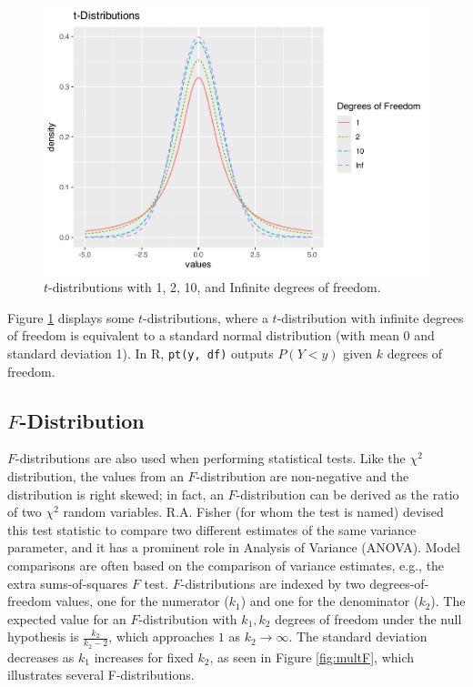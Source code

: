 \documentclass[
]{krantz}
\begin{document}
\begin{figure}

{\centering \includegraphics[width=0.6\linewidth]{bookdown-BeyondMLR_files/figure-latex/multT-1} 

}

\caption{\(t\)-distributions with 1, 2, 10, and Infinite degrees of freedom.}\label{fig:multT}
\end{figure}

Figure \ref{fig:multT} displays some \(t\)-distributions, where a \(t\)-distribution with infinite degrees of freedom is equivalent to a standard normal distribution (with mean 0 and standard deviation 1). In R, \texttt{pt(y,\ df)} outputs \(P(Y < y)\) given \(k\) degrees of freedom.

\subsection{\texorpdfstring{\(F\)-Distribution}{F-Distribution}}\label{f-distribution}

\(F\)-distributions  are also used when performing statistical tests. Like the \(\chi^2\) distribution, the values from an \(F\)-distribution are non-negative and the distribution is right skewed; in fact, an \(F\)-distribution can be derived as the ratio of two \(\chi^2\) random variables. R.A. Fisher (for whom the test is named) devised this test statistic to compare two different estimates of the same variance parameter, and it has a prominent role in Analysis of Variance (ANOVA). Model comparisons are often based on the comparison of variance estimates, e.g., the extra sums-of-squares \(F\) test. \(F\)-distributions are indexed by two degrees-of-freedom values, one for the numerator (\(k_1\)) and one for the denominator (\(k_2\)). The expected value for an \(F\)-distribution with \(k_1, k_2\) degrees of freedom under the null hypothesis is \(\frac{k_2}{k_2 - 2}\), which approaches \(1\) as \(k_2 \rightarrow \infty\). The standard deviation decreases as \(k_1\) increases for fixed \(k_2\), as seen in Figure \ref{fig:multF}, which illustrates several F-distributions.
\end{document}
